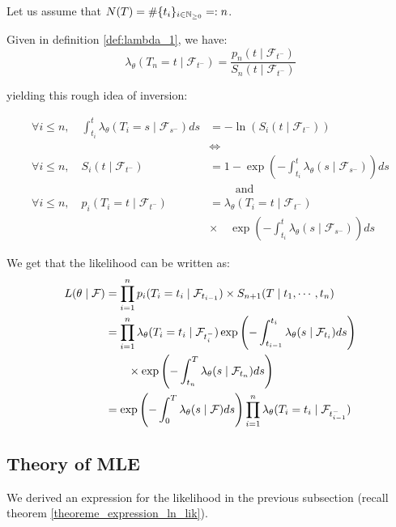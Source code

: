 \documentclass[11pt]{book}
\newcommand{\sequence}[1]{\{ #1 \}_{ i \in \N} }
\begin{document}
\begin{demo}{}{}
Let us assume that $N(T) = \# \sequence{ t_i } =: n$.

Given in definition \ref{def:lambda_1}, we have:
$$\lambda_{\theta}( T_n = t \mid \mathcal F_{t^-} ) = \frac{ p_n( t \mid \mathcal F_{t^-} )}{S_n( t \mid \mathcal F_{t^-} )}$$


yielding  this rough idea of inversion:

\begin{align*}
\forall i \leq n, \quad \int_{t_i}^t \lambda_{\theta}( T_i = s \mid \mathcal F_{s^-} ) ds &= - \ln ( S_i (t \mid \mathcal F_{t^-} ))  \\
& \iff \\
\forall i \leq n, \quad  S_i( t \mid \mathcal F_{t^-} ) & = 1 -  \exp \left ( - \int_{t_i}^t \lambda_{\theta} ( s \mid \mathcal F_{s^-} ) \right ) ds \\
& \qquad \text{ and } \\
\forall i \leq n, \quad  p_i( T_i = t \mid \mathcal F_{t^-} ) & = \lambda_{\theta} ( T_i = t \mid \mathcal F_{t^-} ) \\
& \times \quad \exp \left ( - \int_{t_i}^t \lambda_{\theta} ( s \mid \mathcal F_{s^-} ) \right ) ds 
\end{align*} 


We get that the likelihood can be written as:
\begin{align}
L( \theta \mid \mathcal F ) &= \prod_{i=1}^n p_i( T_i = t_i \mid \mathcal F_{t_{i-1}} ) \times S_{n+1} ( T \mid t_1, \cdots, t_n ) \notag \\
&=  \prod_{i=1}^n  \lambda_{\theta} ( T_i = t_i \mid \mathcal F_{t_i^-} ) \exp \left ( - \int_{t_{i-1}}^{t_{i}} \lambda_{\theta} ( s \mid \mathcal F_{t_i} ) ds \right ) \notag \\
 & \qquad \times \exp \left ( - \int_{t_n}^T \lambda_{\theta} ( s \mid \mathcal F_{t_n} ) ds \right ) \notag \\
&=  \exp \left ( - \int_{0}^{T} \lambda_{\theta} ( s \mid \mathcal F ) ds \right )  \prod_{i=1}^n  \lambda_{\theta} ( T_i = t_i \mid \mathcal F_{t_{i-1}^-} )   
\end{align}
\end{demo}{}{}













\subsection{Theory of MLE}
We derived an expression for the likelihood in the previous subsection (recall theorem \ref{theoreme_expression_ln_lik}). 
\end{document}
